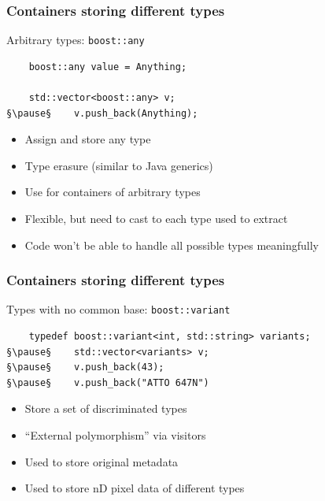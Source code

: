 \documentclass[handout]{beamer}
\begin{document}
\begin{frame}[fragile]
  \frametitle{Containers storing different types}
\begin{block}{Arbitrary types: \texttt{boost::any}}
  \begin{lstlisting}
    boost::any value = Anything;

    std::vector<boost::any> v;
§\pause§    v.push_back(Anything);
\end{lstlisting}
  \begin{itemize}
    \pause
  \item Assign and store any type
  \item Type erasure (similar to Java generics)
  \item Use for containers of arbitrary types
    \pause
  \item Flexible, but need to cast to each type used to extract
  \item Code won't be able to handle all possible types meaningfully
  \end{itemize}
\end{block}
\end{frame}

\begin{frame}[fragile]
  \frametitle{Containers storing different types}
\begin{block}{Types with no common base: \texttt{boost::variant}}
  \begin{lstlisting}
    typedef boost::variant<int, std::string> variants;
§\pause§    std::vector<variants> v;
§\pause§    v.push_back(43);
§\pause§    v.push_back("ATTO 647N")
\end{lstlisting}
  \begin{itemize}
    \pause
  \item Store a set of discriminated types
    \pause
  \item “External polymorphism” via visitors
    \pause
  \item Used to store original metadata
  \item Used to store nD pixel data of different types
  \end{itemize}
\end{block}
\end{frame}
\end{document}
